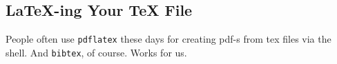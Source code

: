 \documentclass[letterpaper,twocolumn,10pt]{article}
\begin{document}
\subsection{LaTeX-ing Your TeX File}

People often use \texttt{pdflatex} these days for creating pdf-s from
tex files via the shell. And \texttt{bibtex}, of course. Works for us.




\end{document}
